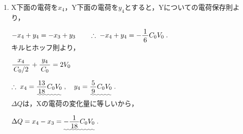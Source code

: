 \documentclass[../../../uem_phy_std_a.tex]{subfiles}
\begin{document}
\begin{enumerate}
            \myspaceb%
            $\displaystyle%
                \myfracc{x_3}{C_0} + \myfracc{y_3}{C_0/2} = 2V_0
            $

            \myspaceb%
            $\displaystyle%
                \therefore \; x_3 = \uwave{\myfraca{7}{9}C_0 V_0} \;,%
                \quad y_3 = \uwave{\myfraca{11}{18}C_0 V_0} \;.
            $\\
            すると，
            
            \myspaceb%
            $\displaystyle%
                E_3 = \myfracc{x_3}{C_0 d} = \uwave{\myfracc{7V_0}{9d}} \;,
            $

            \myspaceb%
            $\displaystyle%
                \phi_3 = \uwave{2V_0} \;,%
                \quad \theta_3 = \myfracc{y_3}{C_0/2} = \uwave{\myfraca{11}{9}V_0} \;.
            $
        \item X下面の電荷を$x_4$，Y下面の電荷を$y_4$とすると，Yについての電荷保存則より，
            
            \myspaceb%
            $\displaystyle%
                -x_4 + y_4 = -x_3 + y_3%
                \qquad \therefore \; -x_4 + y_4 = -\myfraca{1}{6}C_0 V_0 \;.
            $\\
            キルヒホッフ則より，
            
            \myspaceb%
            $\displaystyle%
                \myfracc{x_4}{C_0/2} + \myfracc{y_4}{C_0} = 2V_0
            $

            \myspaceb%
            $\displaystyle%
                \therefore \; x_4 = \uwave{\myfraca{13}{18}C_0 V_0} \;,%
                \quad y_4 = \uwave{\myfraca{5}{9}C_0 V_0} \;.
            $\\
            $\Delta Q$は，Xの電荷の変化量に等しいから，
            
            \myspaceb%
            $\displaystyle%
                \Delta Q = x_4 - x_3 = \uwave{-\myfraca{1}{18}C_0 V_0} \;.
            $            
    \end{enumerate}
\end{document}
